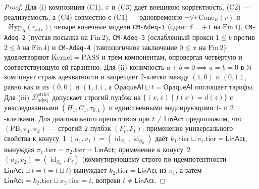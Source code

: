 \documentclass[11pt]{article}
\theoremstyle{plain}
\theoremstyle{definition}
\DeclareMathOperator{\id}{id}
\begin{document}
\begin{proof}
Для (i) композиция \textup{(C1)}, $\pi$ и \textup{(C3)} даёт внешнюю корректность, \textup{(C2)} --- реализуемость, а \textup{(C4)} совместно с \textup{(C1)} --- одновременно $\neg\forall r\,\mathrm{Conc}_R(r)$ и $\neg\mathrm{Hyp}_R(r_{\mathrm{adv}})$; четыре конечные модели \texttt{CM-Adeq-1} (сдвиг $\delta = +1$ на $\mathrm{Fin}\,4$), \texttt{CM-Adeq-2} (пустая посылка на $\mathrm{Fin}\,2$), \texttt{CM-Adeq-3} (ослабленный прокси $1 \le b$ против $2 \le b$ на $\mathrm{Fin}\,4$) и \texttt{CM-Adeq-4} (тавтологичное заключение $0 \le x$ на $\mathrm{Fin}\,2$) удовлетворяют $\mathrm{Kernel} = \mathrm{PASS}$ и трём компонентам, опровергая четвёртую и соответствующую ей гарантию. Для (ii) коничность $a + b = 0 \implies a = b = 0$ в $\mathbb{N}$ компонует страж адекватности и запрещает $2$-клетки между $(1,0)$ и $(0,1)$, равно как и из $(0,0)$ в $(1,1)$, а $\mathsf{OpaqueAI} \sqcup t = \mathsf{OpaqueAI}$ поглощает тарифы. Для (iii) $\mathcal{D}_{\mathrm{adeq}}^{\mathrm{strict}}$ допускает строгий пулбэк на $\{(x,z) \mid f(x) = d(z)\}$ с унаследованными $(H_1, C_1, \tau_{0,1})$ и единственными медиирующими $1$- и $2$-клетками. Для диагонального препятствия при $t \neq \mathsf{LinAct}$ предположим, что $(\mathrm{PB}, \pi_1, \pi_2)$ — строгий $2$-пулбэк $(F_t, F_t)$: применение универсального свойства к конусу~1 $(u_1, v_1) = (\id_{S_0}, \id_{S_0})$ даёт $k_1.\mathrm{tier} \sqcup \pi_i.\mathrm{tier} = \mathsf{LinAct}$, вынуждая $\pi_1.\mathrm{tier} = \pi_2.\mathrm{tier} = \mathsf{LinAct}$; применение к конусу~2 $(u_2, v_2) = (\id_{S_0}, F_t)$ (коммутирующему строго по идемпотентности $\mathsf{LinAct} \sqcup t = t = t \sqcup t$) вынуждает $k_2.\mathrm{tier} = \mathsf{LinAct}$ из $\pi_1$, а затем $\mathsf{LinAct} = k_2.\mathrm{tier} \sqcup \pi_2.\mathrm{tier} = t$, вопреки $t \neq \mathsf{LinAct}$.
\end{proof}
\end{document}
